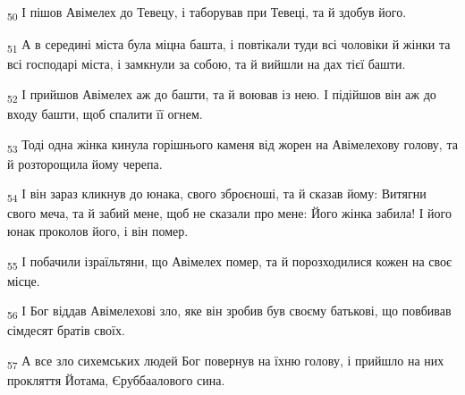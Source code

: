 \begin{tcolorbox}
\textsubscript{50} І пішов Авімелех до Тевецу, і таборував при Тевеці, та й здобув його.
\end{tcolorbox}
\begin{tcolorbox}
\textsubscript{51} А в середині міста була міцна башта, і повтікали туди всі чоловіки й жінки та всі господарі міста, і замкнули за собою, та й вийшли на дах тієї башти.
\end{tcolorbox}
\begin{tcolorbox}
\textsubscript{52} І прийшов Авімелех аж до башти, та й воював із нею. І підійшов він аж до входу башти, щоб спалити її огнем.
\end{tcolorbox}
\begin{tcolorbox}
\textsubscript{53} Тоді одна жінка кинула горішнього каменя від жорен на Авімелехову голову, та й розторощила йому черепа.
\end{tcolorbox}
\begin{tcolorbox}
\textsubscript{54} І він зараз кликнув до юнака, свого зброєноші, та й сказав йому: Витягни свого меча, та й забий мене, щоб не сказали про мене: Його жінка забила! І його юнак проколов його, і він помер.
\end{tcolorbox}
\begin{tcolorbox}
\textsubscript{55} І побачили ізраїльтяни, що Авімелех помер, та й порозходилися кожен на своє місце.
\end{tcolorbox}
\begin{tcolorbox}
\textsubscript{56} І Бог віддав Авімелехові зло, яке він зробив був своєму батькові, що повбивав сімдесят братів своїх.
\end{tcolorbox}
\begin{tcolorbox}
\textsubscript{57} А все зло сихемських людей Бог повернув на їхню голову, і прийшло на них прокляття Йотама, Єруббаалового сина.
\end{tcolorbox}
